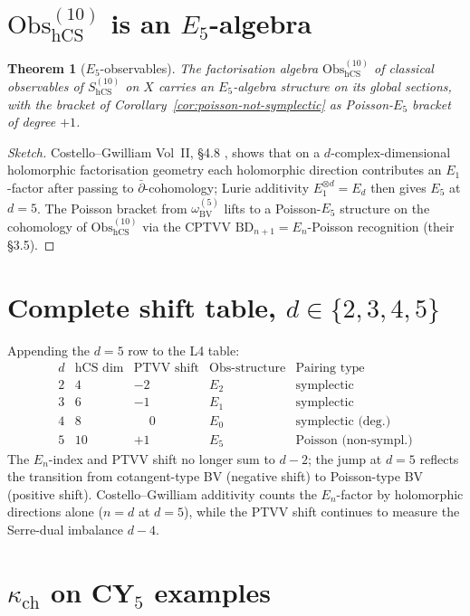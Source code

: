 \documentclass[11pt]{amsart}
\providecommand{\Obs}{\mathrm{Obs}}
\providecommand{\dbar}{\bar{\partial}}
\providecommand{\BV}{\mathrm{BV}}
\providecommand{\hCS}{\mathrm{hCS}}
\providecommand{\kappach}{\kappa_{\mathrm{ch}}}
\theoremstyle{plain}
\newtheorem{theorem}{Theorem}[section]
\theoremstyle{definition}
\begin{document}
\section{$\Obs_{\hCS}^{(10)}$ is an $E_5$-algebra}

\begin{theorem}[$E_5$-observables]
\label{thm:E5-obs}
The factorisation algebra $\Obs_{\hCS}^{(10)}$ of classical
observables of $S_\hCS^{(10)}$ on $X$ carries an $E_5$-algebra
structure on its global sections, with the bracket of
Corollary~\ref{cor:poisson-not-symplectic} as Poisson-$E_5$ bracket
of degree $+1$.
\end{theorem}

\begin{proof}[Sketch]
Costello--Gwilliam Vol~II, §4.8 \cite{CG2021}, shows that on a
$d$-complex-dimensional holomorphic factorisation geometry each
holomorphic direction contributes an $E_1$-factor after passing to
$\dbar$-cohomology; Lurie additivity
$E_1^{\otimes d} = E_d$ then gives $E_5$ at $d=5$. The Poisson
bracket from $\omega_\BV^{(5)}$ lifts to a Poisson-$E_5$ structure
on the cohomology of $\Obs_{\hCS}^{(10)}$ via the CPTVV
$\mathrm{BD}_{n+1} = E_n$-Poisson recognition (their §3.5).
\end{proof}

\section{Complete shift table, $d \in \{2,3,4,5\}$}

Appending the $d=5$ row to the L4 table:
\[
\begin{array}{c|cccc}
d & \text{hCS dim} & \text{PTVV shift} & \text{Obs-structure}
 & \text{Pairing type}\\
\hline
2 & 4 & -2 & E_2 & \text{symplectic}\\
3 & 6 & -1 & E_1 & \text{symplectic}\\
4 & 8 & \phantom{-}0 & E_0 & \text{symplectic (deg.)}\\
5 & 10 & +1 & E_5 & \text{Poisson (non-sympl.)}
\end{array}
\]
The $E_n$-index and PTVV shift no longer sum to $d-2$; the jump at
$d=5$ reflects the transition from cotangent-type BV (negative shift)
to Poisson-type BV (positive shift). Costello--Gwilliam additivity
counts the $E_n$-factor by holomorphic directions alone
($n = d$ at $d=5$), while the PTVV shift continues to measure
the Serre-dual imbalance $d - 4$.

\section{$\kappach$ on CY$_5$ examples}
\end{document}
